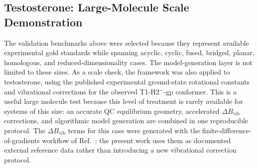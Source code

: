 \documentclass[aip,jcp,reprint,longbibliography,floatfix]{revtex4-2}
\begin{document}
\subsection{Testosterone: Large-Molecule Scale Demonstration}

The validation benchmarks above were selected because they represent available
experimental gold standards while spanning acyclic, cyclic, fused, bridged,
planar, homologous, and reduced-dimensionality cases. The model-generation
layer is not limited to these sizes. As a scale check, the framework was
also applied to testosterone, using the published experimental ground-state
rotational constants and vibrational corrections for the observed
T1-H2$^{-}$-gp conformer.\cite{Uribe2024SteroidHormones} This is a useful large
molecule test because this level of treatment is rarely available for systems
of this size: an accurate QC equilibrium geometry, accelerated
$\Delta B_\mathrm{vib}$ corrections, and algorithmic model generation are
combined in one reproducible protocol. The $\Delta B_\mathrm{vib}$ terms for
this case were generated with the finite-difference-of-gradients workflow of
Ref.~; the present work uses them as
documented external reference data rather than introducing a new vibrational
correction protocol.
\end{document}
